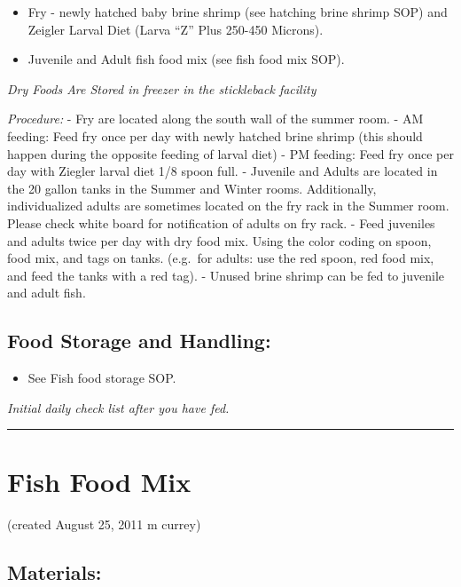 \documentclass[
]{book}
\providecommand{\tightlist}{%
  \setlength{\itemsep}{0pt}\setlength{\parskip}{0pt}}
\begin{document}
\begin{itemize}
\tightlist
\item
  Fry - newly hatched baby brine shrimp (see hatching brine shrimp SOP) and Zeigler Larval Diet (Larva ``Z'' Plus 250-450 Microns).
\item
  Juvenile and Adult fish food mix (see fish food mix SOP).
\end{itemize}

\emph{Dry Foods Are Stored in freezer in the stickleback facility}

\emph{Procedure:}
- Fry are located along the south wall of the summer room.
- AM feeding: Feed fry once per day with newly hatched brine shrimp (this should happen during the opposite feeding of larval diet)
- PM feeding: Feed fry once per day with Ziegler larval diet 1/8 spoon full.
- Juvenile and Adults are located in the 20 gallon tanks in the Summer and Winter rooms. Additionally, individualized adults are sometimes located on the fry rack in the Summer room. Please check white board for notification of adults on fry rack.
- Feed juveniles and adults twice per day with dry food mix. Using the color coding on spoon, food mix, and tags on tanks. (e.g.~for adults: use the red spoon, red food mix, and feed the tanks with a red tag).
- Unused brine shrimp can be fed to juvenile and adult fish.

\hypertarget{food-storage-and-handling}{%
\subsection{Food Storage and Handling:}\label{food-storage-and-handling}}

\begin{itemize}
\tightlist
\item
  See Fish food storage SOP.
\end{itemize}

\emph{Initial daily check list after you have fed. }

\begin{center}\rule{0.5\linewidth}{0.5pt}\end{center}

\hypertarget{fish-food-mix}{%
\section{Fish Food Mix}\label{fish-food-mix}}

(created August 25, 2011 m currey)

\hypertarget{materials-1}{%
\subsection{Materials:}\label{materials-1}}
\end{document}

